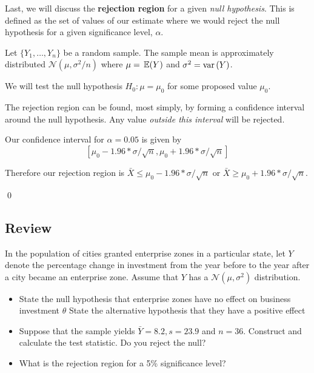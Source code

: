\documentclass[12pt]{article}
\begin{document}
Last, we will discuss the \textbf{rejection region} for a given \emph{null hypothesis}. This is defined as the set of values of our estimate where we would reject the null hypothesis for a given significance level, $\alpha$. 

\begin{example}
  Let $\{ Y_1, \dots, Y_n \}$ be a random sample. The sample mean is approximately distributed $\mathcal{N}(\mu, \sigma^2 / n)$ where $\mu = \expec{Y}$ and $\sigma^2 = \var{Y}$. 

  We will test the null hypothesis $H_0: \mu = \mu_0$ for some proposed value $\mu_0$.

  The rejection region can be found, most simply, by forming a confidence interval around the null hypothesis. Any value \emph{outside this interval} will be rejected.

  Our confidence interval for $\alpha = 0.05$ is given by 
  $$
    \left[ \mu_0 - 1.96 * \sigma/\sqrt{n},  \mu_0 + 1.96 * \sigma/\sqrt{n} \right]
  $$

  Therefore our rejection region is $\bar{X} \leq \mu_0 - 1.96 * \sigma/\sqrt{n}$ or $\bar{X} \geq \mu_0 + 1.96 * \sigma/\sqrt{n}$.

  \qed
\end{example}



\subsection*{Review}

In the population of cities granted enterprise zones in a particular state, let $Y$ denote the percentage change in investment from the year before to the year after a city became an enterprise zone. Assume that $Y$ has a $\mathcal{N}(\mu, \sigma^2)$ distribution.
\begin{itemize}
  \item State the null hypothesis that enterprise zones have no effect on business investment $\theta$ State the alternative hypothesis that they have a positive effect

  \item Suppose that the sample yields $\bar{Y} = 8.2, s = 23.9$ and $n = 36$. Construct and calculate the test statistic. Do you reject the null?

  \item What is the rejection region for a 5\% significance level?
\end{itemize}


\end{document}
